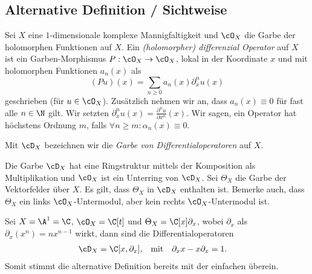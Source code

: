 \subsection{Alternative Definition / Sichtweise}
\begin{comment}
Nur abgeschrieben
\end{comment}
\cite[Chap 1.1.]{kashiwara2003d}
Sei $X$ eine $1$-dimensionale komplexe Mannigfaltigkeit und $\cO_X$ die Garbe
der holomorphen Funktionen auf $X$. Ein \emph{(holomorpher) differenzial
Operator} auf $X$ ist ein Garben-Morphismus $P:\cO_X\rightarrow \cO_X$, lokal
in der Koordinate $x$ und mit holomorphen Funktionen $a_n(x)$ als
\[
(Pu)(x)=\sum_{n\geq0}a_n(x)\partial_x^nu(x)
\]
geschrieben (für $u\in\cO_X$). Zusätzlich nehmen wir an, dass $a_n(x)\equiv 0$
für fast alle $n\in \N$ gilt. Wir setzten
$\partial_x^nu(x)=\frac{\partial^nu}{\partial x^n}(x)$. Wir sagen, ein Operator
hat höchstens Ordnung $m$, falls $\forall n\geq m: \alpha_n(x)\equiv0$.
\begin{defn}
Mit $\cD_X$ bezeichnen wir die \emph{Garbe von Differentialoperatoren} auf $X$.
\end{defn}
Die Garbe $\cD_X$ hat eine Ringstruktur mittels der Komposition als
Multiplikation und $\cO_X$ ist ein Unterring von $\cD_X$. Sei $\Theta_X$ die
Garbe der Vektorfelder über $X$. Es gilt, dass $\Theta_X$ in $\cD_X$
enthalten ist.  Bemerke auch, dass $\Theta_X$ ein links $\cO_X$-Untermodul,
aber kein rechts $\cO_X$-Untermodul ist.

\begin{prop}
\cite[Exmp 1.1]{ArkhipovDmod}
Sei $X=\A^1=\C$, $\cO_X=\C[t]$ und $\Theta_X=\C[x]\partial_x$, wobei
$\partial_x$ als $\partial_x(x^n)=nx^{n-1}$ wirkt, dann sind die
Differentialoperatoren
\begin{align*}
\cD_X &= \C[x,\partial_x], & \mbox{mit} & & \partial_x x-x\partial_x & =1.
\end{align*}
Somit stimmt die alternative Definition bereits mit der einfachen überein.
\end{prop}

\begin{comment}
\begin{defn} \cite[Defn 2.1]{ArkhipovDmod}
Sei $X=\A^1$, $\cO_X=\C[x]$ und $\cD_X=[x,\partial_x]$ mit der Relation
$[\partial_x,x]=1$. Dann definieren wir die links $\cD$-Moduln über $\A^1$ als
die $\C[x,\partial_x]$-Moduln. Sie werden geschrieben als $\cD-mod(\A^1)$
\end{defn}
\end{comment}

